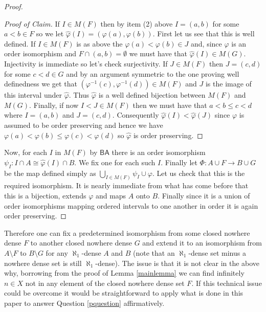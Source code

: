 \documentclass[leqno,11pt]{amsart}
\theoremstyle{definition}
\theoremstyle{remark}
\def\BA{\mathsf{BA}}
\begin{document}
\begin{proof}
    \begin{proof}[Proof of Claim]
        If $I \in M(F)$ then by item (2) above $I = (a, b)$ for some $a < b \in F$ so we let $\hat{\varphi}(I) = (\varphi(a), \varphi(b))$. First let us see that this is well defined. If $I \in M(F)$ is as above the $\varphi(a) < \varphi(b) \in J$ and, since $\varphi$ is an order isomorphism and $F \cap (a, b)= \emptyset$ we must have that $\hat{\varphi}(I) \in M(G)$. Injectivity is immediate so let's check surjectivity. If $J \in M(F)$ then $J = (c, d)$ for some $c < d \in G$ and by an argument symmetric to the one proving well definedness we get that $(\varphi^{-1}(c), \varphi^{-1}(d)) \in M(F)$ and $J$ is the image of this interval under $\hat{\varphi}$. Thus $\hat{\varphi}$ is a well defined bijection between $M(F)$ and $M(G)$. Finally, if now $I < J \in M(F)$ then we must have that $a < b \leq c < d$ where $I = (a, b)$ and $J = (c, d)$. Consequently $\hat{\varphi}(I) < \hat{\varphi}(J)$ since $\varphi$ is assumed to be order preserving and hence we have $\varphi(a) < \varphi(b) \leq \varphi(c) < \varphi(d)$ so $\hat{\varphi}$ is order preserving.
    \end{proof}

Now, for each $I$ in $M(F)$ by $\BA$ there is an order isomorphism $\psi_I: I \cap A \cong \hat{\varphi}(I) \cap B$. We fix one for each such $I$. Finally let $\Phi:A \cup F \to B \cup G$ be the map defined simply as $\bigcup_{I \in M(F)}\psi_I \cup \varphi$. Let us check that this is the required isomorphism. It is nearly immediate from what has come before that this is a bijection, extends $\varphi$ and maps $A$ onto $B$. Finally since it is a union of order isomorphisms mapping ordered intervals to one another in order it is again order preserving. 
\end{proof}

Therefore one can fix a predetermined isomorphism from some closed nowhere dense $F$ to another closed nowhere dense $G$ and extend it to an isomorphism from $A \setminus F$ to $B \setminus G$ for any $\aleph_1$-dense $A$ and $B$ (note that an $\aleph_1$-dense set minus a nowhere dense set is still $\aleph_1$-dense). The issue is that it is not clear in the above why, borrowing from the proof of Lemma \ref{mainlemma} we can find infinitely $n \in X$ not in any element of the closed nowhere dense set $F$. If this technical issue could be overcome it would be straightforward to apply what is done in this paper to answer Question \ref{pquestion} affirmatively. 



\end{document}
